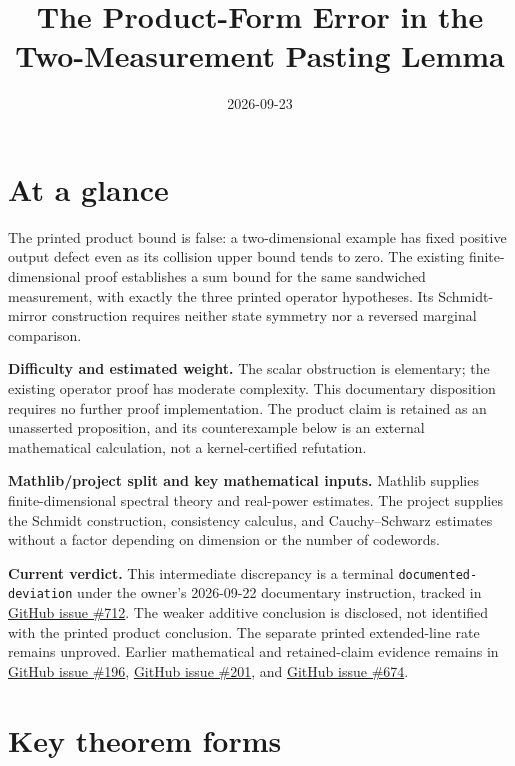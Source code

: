 \documentclass[11pt]{article}
\title{The Product-Form Error in the Two-Measurement Pasting Lemma}
\author{}
\date{2026-09-23}
\renewcommand{\ghissue}[1]{%
  \href{https://github.com/Dengnifer/MIPStarRE-QPBT/issues/#1}{GitHub issue \##1}}
\begin{document}
\maketitle

\section{At a glance}

The printed product bound is false: a two-dimensional example has fixed
positive output defect even as its collision upper bound tends to zero.
The existing finite-dimensional proof establishes a sum bound for the same
sandwiched measurement, with exactly the three printed operator hypotheses.
Its Schmidt-mirror construction requires neither state symmetry nor a
reversed marginal comparison.

\textbf{Difficulty and estimated weight.} The scalar obstruction is elementary;
the existing operator proof has moderate complexity. This documentary
disposition requires no further proof implementation. The product claim is
retained as an unasserted proposition, and its counterexample below is an
external mathematical calculation, not a kernel-certified refutation.

\textbf{Mathlib/project split and key mathematical inputs.} Mathlib supplies
finite-dimensional spectral theory and real-power estimates. The project
supplies the Schmidt construction, consistency calculus, and
Cauchy--Schwarz estimates without a factor depending on dimension or the
number of codewords.

\textbf{Current verdict.} This intermediate discrepancy is a terminal
\texttt{documented-deviation} under the owner's 2026-09-22 documentary
instruction, tracked in \ghissue{712}. The weaker additive conclusion is
disclosed, not identified with the printed product conclusion. The separate
printed extended-line rate remains unproved. Earlier mathematical and
retained-claim evidence remains in \ghissue{196}, \ghissue{201}, and
\ghissue{674}.

\section{Key theorem forms}
\end{document}
